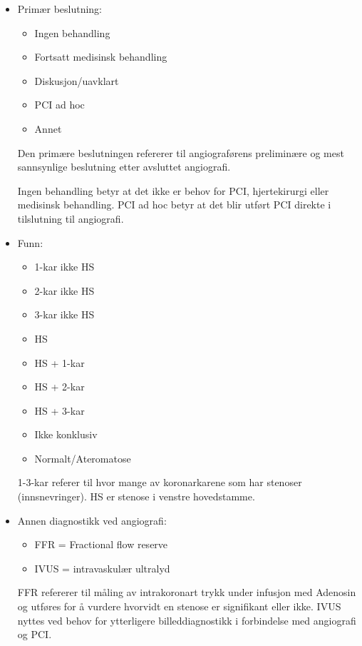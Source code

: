 \documentclass[norsk, a4paper]{report}
\begin{document}
\begin{itemize}
  \item{Primær beslutning:}
    \begin{itemize}
      \item{Ingen behandling}
      \item{Fortsatt medisinsk behandling}
      \item{Diskusjon/uavklart}
      \item{PCI ad hoc}
      \item{Annet}
    \end{itemize}

Den primære beslutningen refererer til angiograførens preliminære og mest sannsynlige beslutning etter avsluttet angiografi. 

Ingen behandling betyr at det ikke er behov for PCI, hjertekirurgi eller medisinsk behandling. PCI ad hoc betyr at det blir utført PCI direkte i tilslutning til angiografi. 

  \item{Funn:}
    \begin{itemize}
      \item{1-kar ikke HS}
      \item{2-kar ikke HS}
      \item{3-kar ikke HS}
      \item{HS}
      \item{HS + 1-kar}
      \item{HS + 2-kar}
      \item{HS + 3-kar}
      \item{Ikke konklusiv}
      \item{Normalt/Ateromatose}
    \end{itemize}
       
1-3-kar referer til hvor mange av koronarkarene som har stenoser (innsnevringer).
HS er stenose i venstre hovedstamme. 


  \item{Annen diagnostikk ved angiografi:}
    \begin{itemize}
      \item{FFR = Fractional flow reserve}
      \item{IVUS = intravaskulær ultralyd}
    \end{itemize}

FFR refererer til måling av intrakoronart trykk under infusjon med Adenosin og utføres for å vurdere hvorvidt en stenose er signifikant eller ikke. IVUS nyttes ved behov for ytterligere billeddiagnostikk i forbindelse med angiografi og PCI.

\end{itemize}
\end{document}
